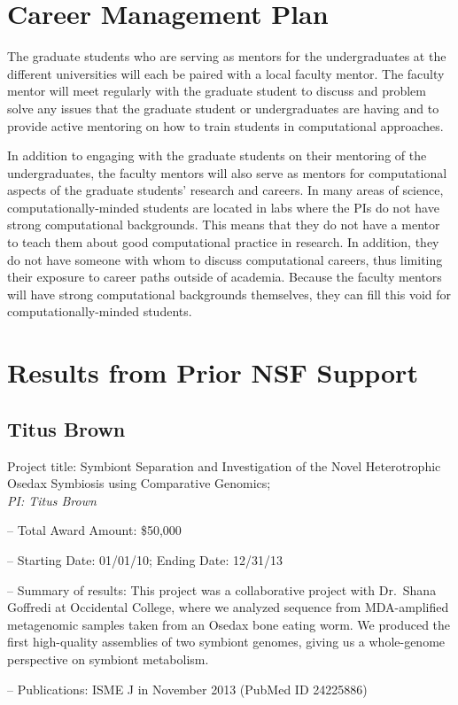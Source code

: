 \documentclass{proposalnsf}
\newlength{\up}
\begin{document}
\section{Career Management Plan}

The graduate students who are serving as mentors for the
undergraduates at the different universities will each be paired with
a local faculty mentor. The faculty mentor will meet regularly with
the graduate student to discuss and problem solve any issues that the
graduate student or undergraduates are having and to provide active
mentoring on how to train students in computational approaches.

In addition to engaging with the graduate students on their mentoring
of the undergraduates, the faculty mentors will also serve as
mentors for computational aspects of the graduate students' research
and careers. In many areas of science, computationally-minded students
are located in labs where the PIs do not have strong computational
backgrounds. This means that they do not have a mentor to teach them
about good computational practice in research. In addition, they do
not have someone with whom to discuss computational careers, thus limiting
their exposure to career paths outside of academia. Because the
faculty mentors will have strong computational backgrounds themselves,
they can fill this void for computationally-minded students.

\section{Results from Prior NSF Support}

\subsection{Titus Brown}
 Project title: Symbiont Separation and Investigation of the Novel Heterotrophic Osedax Symbiosis using Comparative Genomics;\\
{\it PI: Titus Brown}
\begin{compactitem}
\item[--] Total Award Amount: \$50,000
\item[--] Starting Date: 01/01/10; Ending Date: 12/31/13
\item[--] Summary of results: This project was a collaborative project with Dr.\ Shana Goffredi at Occidental College, where we analyzed sequence from MDA-amplified metagenomic samples taken from an Osedax bone eating worm. We produced the first high-quality assemblies of two symbiont genomes, giving us a whole-genome perspective on symbiont metabolism.
\item[--] Publications: ISME J in November 2013 (PubMed ID 24225886)
\end{compactitem}
\end{document}
